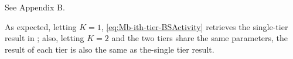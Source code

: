 \documentclass[12pt,draftclsnofoot,journal,onecolumn]{IEEEtran}
\def\dd{\mathrm{d}}
\def\eqc{\stackrel{{\rm (c)}}{=}}
\def\eqd{\stackrel{{\rm (d)}}{=}}
\begin{document}
%	
%	
\begin{IEEEproof}
	See Appendix B.
\end{IEEEproof}
	As expected, letting $K=1$, \eqref{eq:Mb-ith-tier-BSActivity} retrieves the single-tier result in \cite[Thm.~3]{MHmeta}; also, letting $K=2$ and the two tiers share the same parameters, the result of each tier is also the same as the-single tier result.
 
\end{document}
